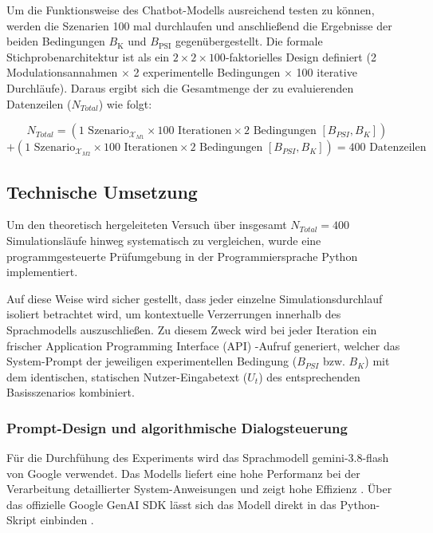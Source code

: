 Um die Funktionsweise des Chatbot-Modells ausreichend testen zu können, werden die Szenarien 100 mal durchlaufen und anschließend die Ergebnisse der beiden Bedingungen $B_{\text{K}}$ und $B_{\text{PSI}}$ gegenübergestellt. 
Die formale Stichprobenarchitektur ist als ein $2 \times 2 \times 100$-faktorielles Design definiert (2 Modulationsannahmen $\times$ 2 experimentelle Bedingungen $\times$ 100 iterative Durchläufe). Daraus ergibt sich die Gesamtmenge der zu evaluierenden Datenzeilen ($N_{Total}$) wie folgt:

\begin{equation}
    N_{Total} = \left( 1\text{ Szenario}_{\mathcal{X}_{M1}} \times 100\text{ Iterationen} \times 2\text{ Bedingungen } [B_{PSI}, B_{K}] \right) 
\end{equation}
\begin{equation*}
    + \left( 1\text{ Szenario}_{\mathcal{X}_{M2}} \times 100\text{ Iterationen} \times 2\text{ Bedingungen } [B_{PSI}, B_{K}] \right) = 400\text{ Datenzeilen}
\end{equation*}

\subsection{Technische Umsetzung}

Um den theoretisch hergeleiteten Versuch über insgesamt $N_{Total} = 400$ Simulationsläufe hinweg systematisch zu vergleichen, wurde eine programmgesteuerte Prüfumgebung in der Programmiersprache Python implementiert. 

Auf diese Weise wird sicher gestellt, dass jeder einzelne Simulationsdurchlauf isoliert betrachtet wird, um kontextuelle Verzerrungen innerhalb des Sprachmodells auszuschließen. Zu diesem Zweck wird bei jeder Iteration ein frischer Application Programming Interface (API) -Aufruf generiert, welcher das System-Prompt der jeweiligen experimentellen Bedingung ($B_{PSI}$ bzw. $B_K$) mit dem identischen, statischen Nutzer-Eingabetext ($U_t$) des entsprechenden Basisszenarios kombiniert.

\subsubsection{Prompt-Design und algorithmische Dialogsteuerung}
Für die Durchfühung des Experiments wird das Sprachmodell gemini-3.8-flash von Google verwendet. Das Modells liefert eine hohe Performanz bei der Verarbeitung detaillierter System-Anweisungen und zeigt hohe Effizienz \citep{GoogleDeepMind2026Gemini38Flash}. Über das offizielle Google GenAI SDK lässt sich das Modell direkt in das Python-Skript einbinden \citep{Google2026GenAISDK}.

